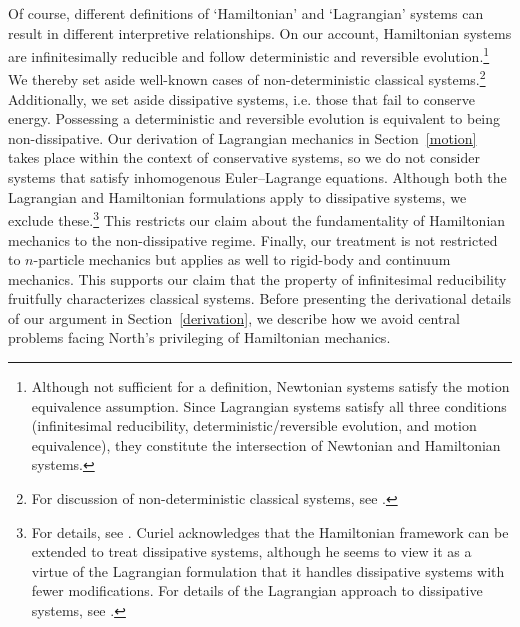 \documentclass[12pt, english, twoside]{article} %
\begin{document}
Of course, different definitions of `Hamiltonian' and `Lagrangian' systems can result in different interpretive relationships. On our account, Hamiltonian systems are infinitesimally reducible and follow deterministic and reversible evolution.\footnote{Although not sufficient for a definition, Newtonian systems satisfy the motion equivalence assumption. Since Lagrangian systems satisfy all three conditions (infinitesimal reducibility, deterministic/reversible evolution, and motion equivalence), they constitute the intersection of Newtonian and Hamiltonian systems.} We thereby set aside well-known cases of non-deterministic classical systems.\footnote{For discussion of non-deterministic classical systems, see \textcites*[3-4]{Baez}{Earman}{Norton}.} Additionally, we set aside dissipative systems, i.e. those that fail to conserve energy. Possessing a deterministic and reversible evolution is equivalent to being non-dissipative. Our derivation of Lagrangian mechanics in Section~\ref{motion} takes place within the context of conservative systems, so we do not consider systems that satisfy inhomogenous Euler--Lagrange equations. Although both the Lagrangian and Hamiltonian formulations apply to dissipative systems, we exclude these.\footnote{For details, see \textcites[\S 10.4]{Cline}. Curiel \parencites*[311]{Curiel} acknowledges that the Hamiltonian framework can be extended to treat dissipative systems, although he seems to view it as a virtue of the Lagrangian formulation that it handles dissipative systems with fewer modifications. For details of the Lagrangian approach to dissipative systems, see \textcites[]{Smith}.} This restricts our claim about the fundamentality of Hamiltonian mechanics to the non-dissipative regime. Finally, our treatment is not restricted to $n$-particle mechanics but applies as well to rigid-body and continuum mechanics. This supports our claim that the property of infinitesimal reducibility fruitfully characterizes classical systems. Before presenting the derivational details of our argument in Section~\ref{derivation}, we describe how we avoid central problems facing North's privileging of Hamiltonian mechanics. 
\end{document}
